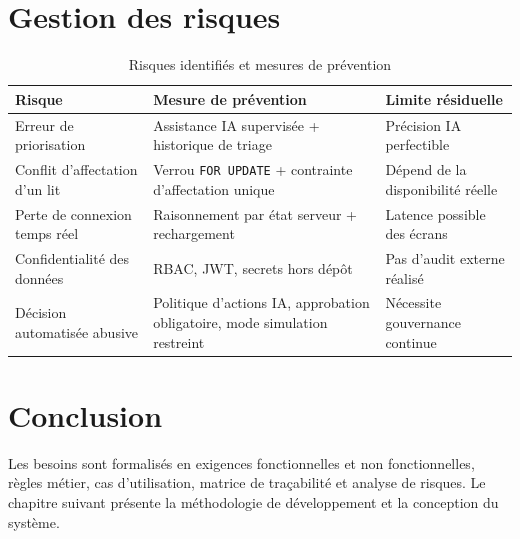 \section{Gestion des risques}

\begin{table}[H]
\centering
\caption{Risques identifiés et mesures de prévention}
\label{tab:risques}
\small
\begin{tabular}{|p{3.4cm}|p{5.6cm}|p{4.4cm}|}
\hline
\textbf{Risque} & \textbf{Mesure de prévention} & \textbf{Limite résiduelle} \\
\hline
Erreur de priorisation & Assistance IA supervisée + historique de triage & Précision IA perfectible \\
\hline
Conflit d'affectation d'un lit & Verrou \texttt{FOR UPDATE} + contrainte d'affectation unique & Dépend de la disponibilité réelle \\
\hline
Perte de connexion temps réel & Raisonnement par état serveur + rechargement & Latence possible des écrans \\
\hline
Confidentialité des données & RBAC, JWT, secrets hors dépôt & Pas d'audit externe réalisé \\
\hline
Décision automatisée abusive & Politique d'actions IA, approbation obligatoire, mode simulation restreint & Nécessite gouvernance continue \\
\hline
\end{tabular}
\end{table}

\section{Conclusion}

Les besoins sont formalisés en exigences fonctionnelles et non fonctionnelles, règles métier, cas d'utilisation, matrice de traçabilité et analyse de risques. Le chapitre suivant présente la méthodologie de développement et la conception du système.
